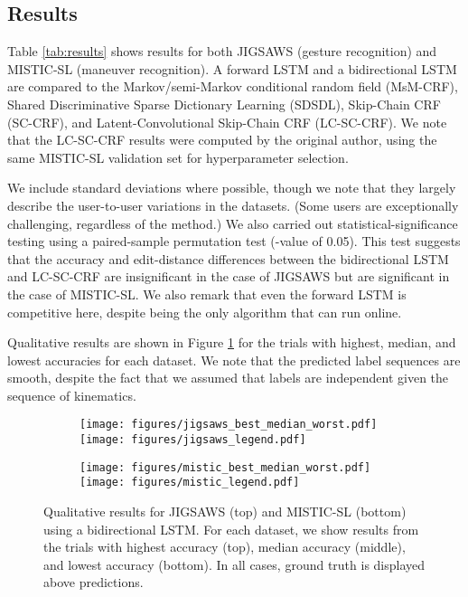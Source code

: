 \documentclass{llncs}
\begin{document}
\subsection{Results}

Table \ref{tab:results} shows results for both JIGSAWS (gesture recognition) and MISTIC-SL (maneuver recognition). A forward LSTM and a bidirectional LSTM are compared to the Markov/semi-Markov conditional random field (MsM-CRF), Shared Discriminative Sparse Dictionary Learning (SDSDL), Skip-Chain CRF (SC-CRF), and Latent-Convolutional Skip-Chain CRF (LC-SC-CRF). We note that the LC-SC-CRF results were computed by the original author, using the same MISTIC-SL validation set for hyperparameter selection.

We include standard deviations where possible, though we note that they largely describe the user-to-user variations in the datasets. (Some users are exceptionally challenging, regardless of the method.) We also carried out statistical-significance testing using a paired-sample permutation test (-value of 0.05). This test suggests that the accuracy and edit-distance differences between the bidirectional LSTM and LC-SC-CRF are insignificant in the case of JIGSAWS but are significant in the case of MISTIC-SL. We also remark that even the forward LSTM is competitive here, despite being the only algorithm that can run online.

Qualitative results are shown in Figure \ref{fig:results} for the trials with highest, median, and lowest accuracies for each dataset. We note that the predicted label sequences are smooth, despite the fact that we assumed that labels are independent given the sequence of kinematics.

\begin{figure}[t]
	\centering
	\begin{subfigure}[b]{1.0\textwidth}
		\centering
		\texttt{[image: figures/jigsaws\_best\_median\_worst.pdf]}
		\texttt{[image: figures/jigsaws\_legend.pdf]}
	\end{subfigure}
	\hfill
	\begin{subfigure}[b]{1.0\textwidth}
		\centering
		\texttt{[image: figures/mistic\_best\_median\_worst.pdf]}
		\texttt{[image: figures/mistic\_legend.pdf]}
	\end{subfigure}
	\caption{Qualitative results for JIGSAWS (top) and MISTIC-SL (bottom) using a bidirectional LSTM. For each dataset, we show results from the trials with highest accuracy (top), median accuracy (middle), and lowest accuracy (bottom). In all cases, ground truth is displayed above predictions.}
	\label{fig:results}
\end{figure}
\end{document}
